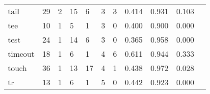 \begin{longtable}{lp{1.2cm}p{1.2cm}p{1.2cm}p{1.2cm}p{1.2cm}p{1.2cm}p{1.2cm}p{1.2cm}p{1.2cm}p{1.2cm}}
tail      &                                    29 &                                                  2 &                                                 15 &                                                  6 &                                                  3 &                                                  3 &                                         0.414 &                                              0.931 &                                              0.103 \\
tee       &                                    10 &                                                  1 &                                                  5 &                                                  1 &                                                  3 &                                                  0 &                                         0.400 &                                              0.900 &                                              0.000 \\
test      &                                    24 &                                                  1 &                                                 14 &                                                  6 &                                                  3 &                                                  0 &                                         0.365 &                                              0.958 &                                              0.000 \\
timeout   &                                    18 &                                                  1 &                                                  6 &                                                  1 &                                                  4 &                                                  6 &                                         0.611 &                                              0.944 &                                              0.333 \\
touch     &                                    36 &                                                  1 &                                                 13 &                                                 17 &                                                  4 &                                                  1 &                                         0.438 &                                              0.972 &                                              0.028 \\
tr        &                                    13 &                                                  1 &                                                  6 &                                                  1 &                                                  5 &                                                  0 &                                         0.442 &                                              0.923 &                                              0.000 \\

\end{longtable}
